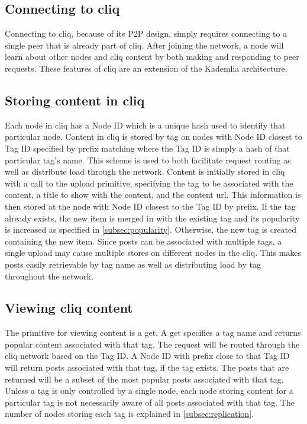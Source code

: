 \documentclass{sig-alternate}
\begin{document}
\subsection{Connecting to cliq}

Connecting to cliq, because of its P2P design, simply requires connecting to a single peer that is already part of cliq. 
After joining the network, a node will learn about other nodes and cliq content by both making and responding to peer requests. 
These features of cliq are an extension of the Kademlia architecture.

\subsection{Storing content in cliq}
\label{subsec:upload}

Each node in cliq has a Node ID which is a unique hash used to identify that particular node. 
Content in cliq is stored by tag on nodes with Node ID closest to Tag ID specified by prefix matching where the Tag ID is simply a hash of that particular tag's name. 
This scheme is used to both facilitate request routing as well as distribute load through the network. 
Content is initially stored in cliq with a call to the upload primitive, specifying the tag to be associated with the content, a title to show with the content, and the content url. 
This information is then stored at the node with Node ID closest to the Tag ID by prefix. 
If the tag already exists, the new item is merged in with the existing tag and its popularity is increased as specified in \ref{subsec:popularity}. 
Otherwise, the new tag is created containing the new item. 
Since posts can be associated with multiple tags, a single upload may cause multiple stores on different nodes in the cliq. 
This makes posts easily retrievable by tag name as well as distributing load by tag throughout the network. 

\subsection{Viewing cliq content}

The primitive for viewing content is a get. 
A get specifies a tag name and returns popular content associated with that tag. 
The request will be routed through the cliq network based on the Tag ID. 
A Node ID with prefix close to that Tag ID will return posts associated with that tag, if the tag exists. 
The posts that are returned will be a subset of the most popular posts associated with that tag. 
Unless a tag is only controlled by a single node, each node storing content for a particular tag is not necessarily aware of all posts associated with that tag. 
The number of nodes storing each tag is explained in \ref{subsec:replication}. 
\end{document}
